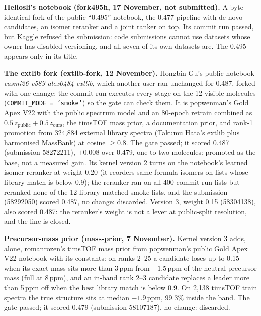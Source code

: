 \documentclass[11pt]{article}
\begin{document}
\textbf{Heliosli's notebook (fork495h, 17 November, not submitted).} A byte-identical fork of the public ``0.495''
notebook, the 0.477 pipeline with de novo candidates, an isomer reranker and a joint ranker on top. Its commit run
passed, but Kaggle refused the submission: code submissions cannot use datasets whose owner has disabled versioning,
and all seven of its own datasets are. The 0.495 appears only in its title.

\textbf{The extlib fork (extlib-fork, 12 November).} Hongbin Gu's public notebook
\emph{casmi26-v589-alex0484-extlib}, which another user ran unchanged for 0.487, forked with one change: the commit run
executes every stage on the 12 visible molecules (\texttt{COMMIT\_MODE = 'smoke'}) so the gate can check them. It is
popwenman's Gold Apex V22 with the public spectrum model and an 80-epoch retrain combined as
$0.5\,z_\text{public} + 0.5\,z_\text{ours}$, the timsTOF mass prior, a documentation prior, and rank-1 promotion from
324{,}884 external library spectra (Takumu Hata's extlib plus harmonised MassBank) at cosine $\ge 0.8$. The gate
passed; it scored 0.487 (submission 58272211), $+0.008$ over 0.479, one to two molecules: promoted as the base, not a
measured gain. Its kernel version 2 turns on the notebook's learned isomer reranker at weight 0.20 (it reorders same-formula isomers
on lists whose library match is below 0.9); the reranker ran on all 400 commit-run lists but reranked none of the 12
library-matched smoke lists, and the submission (58292050) scored 0.487, no change: discarded. Version 3, weight 0.15
(58304138), also scored 0.487: the reranker's weight is not a lever at public-split resolution, and the line is closed.

\textbf{Precursor-mass prior (mass-prior, 7 November).} Kernel version 3 adds, alone, romanrozen's timsTOF mass
prior from popwenman's public Gold Apex V22 notebook with its constants: on ranks 2--25 a candidate loses up to 0.15
when its exact mass sits more than 3\,ppm from $-1.5$\,ppm of the neutral precursor mass (full at 8\,ppm), and an
in-band rank 2--3 candidate replaces a leader more than 5\,ppm off when the best library match is below 0.9. On 2{,}138
timsTOF train spectra the true structure sits at median $-1.9$\,ppm, 99.3\% inside the band. The gate passed; it
scored 0.479 (submission 58107187), no change: discarded.
\end{document}
